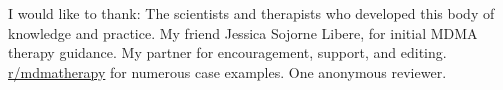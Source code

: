 \documentclass[12pt,letterpaper]{book}
\begin{document}



I would like to thank: The scientists and therapists who developed this body of knowledge and practice. My friend Jessica Sojorne Libere, for initial MDMA therapy guidance. My partner for encouragement, support, and editing. \href{https://www.reddit.com/r/mdmatherapy}{r/mdmatherapy} for numerous case examples. One anonymous reviewer.
\end{document}
